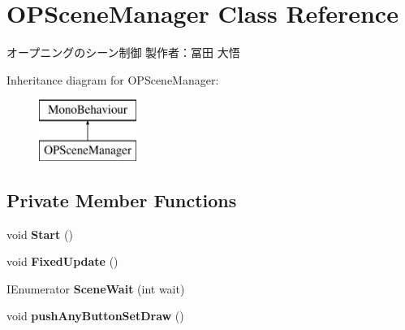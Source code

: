 \hypertarget{class_o_p_scene_manager}{}\section{O\+P\+Scene\+Manager Class Reference}
\label{class_o_p_scene_manager}


オープニングのシーン制御 製作者：冨田 大悟  


Inheritance diagram for O\+P\+Scene\+Manager\+:\begin{figure}[H]
\begin{center}
\leavevmode
\includegraphics[height=2.000000cm]{class_o_p_scene_manager}
\end{center}
\end{figure}
\subsection*{Private Member Functions}
\begin{DoxyCompactItemize}
\item 
\mbox{\label{class_o_p_scene_manager_a2abe1fd7fa250a7611fc3173237f3148}} 
void {\bfseries Start} ()
\item 
\mbox{\label{class_o_p_scene_manager_a6b3b1085b1013a9715e388a4ce6a1c4e}} 
void {\bfseries Fixed\+Update} ()
\item 
\mbox{\label{class_o_p_scene_manager_ae1fd5ac34389421e0467372763272ab8}} 
I\+Enumerator {\bfseries Scene\+Wait} (int wait)
\item 
\mbox{\label{class_o_p_scene_manager_ae0a98301470fb3d5017b048f71c5b433}} 
void {\bfseries push\+Any\+Button\+Set\+Draw} ()
\end{DoxyCompactItemize}
